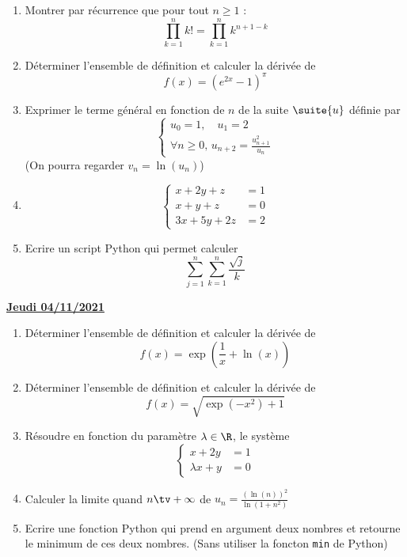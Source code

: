 \documentclass[a4paper, 11pt,reqno]{article}
\newcommand{\jour}[1]{
\begin{center}
\underline{\textbf{#1}}
\end{center}

 }
\begin{document}
\begin{exercice}
\begin{enumerate}
\item  Montrer par récurrence que pour tout $n\geq 1$ :
$$\prod_{k=1}^n k! = \prod_{k=1}^n k^{n+1-k}$$
\item  Déterminer l'ensemble de définition et calculer la dérivée de
$$f(x)=(e^{2x}-1)^{\pi}$$
\item Exprimer le terme général en fonction de $n$ de la suite $\suite{u}$ définie par 
$$\left\{\begin{array}{l}
u_0 =1, \quad u_1=2\\
\forall n\geq 0,\,  u_{n+2}= \frac{u_{n+1}^2}{u_n}
\end{array}\right.$$
(On pourra regarder $v_n=\ln(u_n)$)
\item $$\left\{ 
\begin{array}{cc}
x+2y+z&=1\\
x+y+z&=0\\
3x+5y+2z&=2
\end{array}
\right.$$
\item Ecrire un script Python qui permet calculer 
$$\sum_{j=1}^n\sum_{k=1}^n \frac{\sqrt{j}}{k}$$
\end{enumerate}
\end{exercice}

\jour{Jeudi 04/11/2021}
\begin{exercice}
\begin{enumerate}
\item  Déterminer l'ensemble de définition et calculer la dérivée de
$$f(x)= \exp\left(\frac{1}{x}+\ln(x)\right)$$
\item  Déterminer l'ensemble de définition et calculer la dérivée de
$$f(x) = \sqrt{\exp(-x^2)+1}$$
\item Résoudre en fonction du paramètre $\lambda\in \R$, le système $$\left\{ 
\begin{array}{cc}
x+2y&=1\\
\lambda x+y&=0
\end{array}
\right.$$
\item Calculer la limite quand $n\tv+\infty$ de $u_n=\frac{(\ln(n))^2}{\ln(1+n^2)}$
\item Ecrire une fonction Python qui prend en argument deux nombres et retourne le minimum de ces deux nombres. 
(Sans utiliser la foncton \texttt{min} de Python)
\end{enumerate}
\end{exercice}
\end{document}
